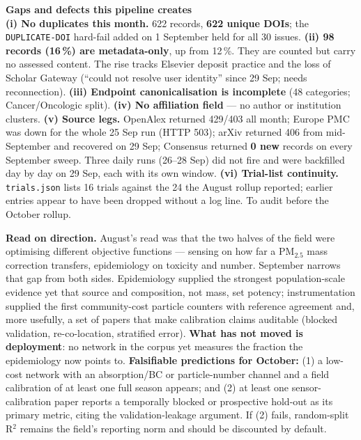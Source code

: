 \documentclass[10pt]{article}
\begin{document}
\begin{keybox}
{\sffamily\bfseries\footnotesize\color{Deep}Gaps and defects this pipeline creates}\\[1.2mm]
\footnotesize
\textbf{(i) No duplicates this month.} 622 records, \textbf{622 unique DOIs}; the
\texttt{DUPLICATE-DOI} hard-fail added on 1 September held for all 30 issues.
\textbf{(ii) 98 records (16\,\%) are metadata-only}, up from 12\,\%. They are counted but carry no
assessed content. The rise tracks Elsevier deposit practice and the loss of Scholar Gateway
(``could not resolve user identity'' since 29 Sep; needs reconnection).
\textbf{(iii) Endpoint canonicalisation is incomplete} (48 categories; Cancer/Oncologic split).
\textbf{(iv) No affiliation field} --- no author or institution clusters.
\textbf{(v) Source legs.} OpenAlex returned 429/403 all month; Europe PMC was down for the whole 25
Sep run (HTTP 503); arXiv returned 406 from mid-September and recovered on 29 Sep; Consensus
returned \textbf{0 new} records on every September sweep. Three daily runs (26--28 Sep) did not fire
and were backfilled day by day on 29 Sep, each with its own window.
\textbf{(vi) Trial-list continuity.} \texttt{trials.json} lists 16 trials against the 24 the August
rollup reported; earlier entries appear to have been dropped without a log line. To audit before
the October rollup.
\end{keybox}

\vspace{3mm}

\footnotesize
\textbf{Read on direction.} August's read was that the two halves of the field were optimising
different objective functions --- sensing on how far a PM$_{2.5}$ mass correction transfers,
epidemiology on toxicity and number. September narrows that gap from both sides. Epidemiology
supplied the strongest population-scale evidence yet that source and composition, not mass, set
potency; instrumentation supplied the first community-cost particle counters with reference
agreement and, more usefully, a set of papers that make calibration claims auditable (blocked
validation, re-co-location, stratified error). \textbf{What has not moved is deployment}: no network
in the corpus yet measures the fraction the epidemiology now points to.
\textbf{Falsifiable predictions for October:}
(1) a low-cost network with an absorption/BC or particle-number channel and a field calibration of
at least one full season appears; and
(2) at least one sensor-calibration paper reports a temporally blocked or prospective hold-out as
its primary metric, citing the validation-leakage argument. If (2) fails, random-split R$^2$ remains
the field's reporting norm and should be discounted by default.
\end{document}
